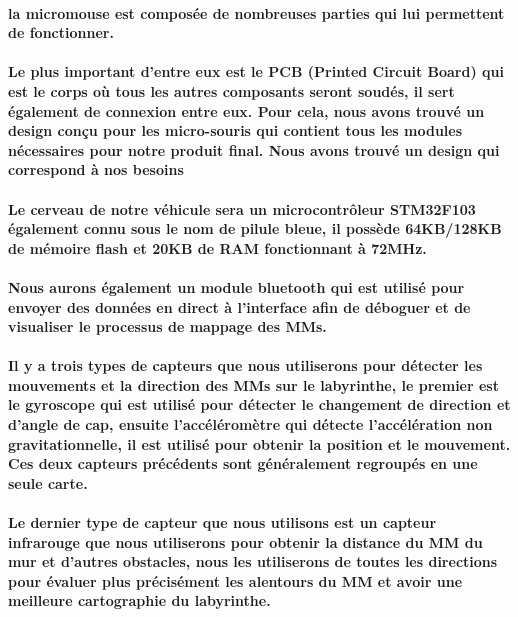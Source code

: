 \paragraph{
   la micromouse est composée de nombreuses parties qui lui permettent de fonctionner.
}

\paragraph{
   Le plus important d'entre eux est le PCB (Printed Circuit Board) qui est le corps où tous les
autres composants seront soudés, il sert également de connexion entre eux. Pour cela, nous avons
trouvé un design conçu pour les micro-souris qui contient tous les modules nécessaires pour notre
produit final. Nous avons trouvé un design qui correspond à nos besoins 
}

\paragraph{
   Le cerveau de notre véhicule sera un microcontrôleur STM32F103 également connu sous le nom de
   pilule bleue, il possède 64KB/128KB de mémoire flash et 20KB de RAM fonctionnant à 72MHz.
}

\paragraph{
   Nous aurons également un module bluetooth qui est utilisé pour envoyer des données en direct
   à l'interface afin de déboguer et de visualiser le processus de mappage des MMs.
}

\paragraph{
   Il y a trois types de capteurs que nous utiliserons pour détecter les mouvements et la direction
des MMs sur le labyrinthe, le premier est le gyroscope qui est utilisé pour détecter le changement
de direction et d'angle de cap, ensuite l'accéléromètre qui détecte l'accélération non
gravitationnelle, il est utilisé pour obtenir la position et le mouvement. Ces deux capteurs
précédents sont généralement regroupés en une seule carte.
}

\paragraph{
   Le dernier type de capteur que nous utilisons est un capteur infrarouge que nous utiliserons
pour obtenir la distance du MM du mur et d'autres obstacles, nous les utiliserons de toutes les
directions pour évaluer plus précisément les alentours du MM et avoir une meilleure cartographie
du labyrinthe.
}

